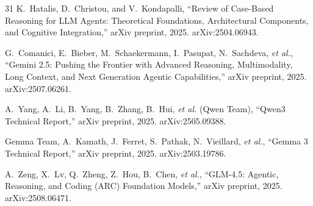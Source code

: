 \documentclass[lettersize,journal]{IEEEtran}
\begin{document}
\begin{thebibliography}{31}
K.~Hatalis, D.~Christou, and V.~Kondapalli, ``Review of Case-Based Reasoning for LLM Agents: Theoretical Foundations, Architectural Components, and Cognitive Integration,'' arXiv preprint, 2025. arXiv:2504.06943.

G.~Comanici, E.~Bieber, M.~Schaekermann, I.~Pasupat, N.~Sachdeva, \textit{et al.}, ``Gemini 2.5: Pushing the Frontier with Advanced Reasoning, Multimodality, Long Context, and Next Generation Agentic Capabilities,'' arXiv preprint, 2025. arXiv:2507.06261.

A.~Yang, A.~Li, B.~Yang, B.~Zhang, B.~Hui, \textit{et al.} (Qwen Team), ``Qwen3 Technical Report,'' arXiv preprint, 2025. arXiv:2505.09388.

Gemma Team, A.~Kamath, J.~Ferret, S.~Pathak, N.~Vieillard, \textit{et al.}, ``Gemma 3 Technical Report,'' arXiv preprint, 2025. arXiv:2503.19786.

A.~Zeng, X.~Lv, Q.~Zheng, Z.~Hou, B.~Chen, \textit{et al.}, ``GLM-4.5: Agentic, Reasoning, and Coding (ARC) Foundation Models,'' arXiv preprint, 2025. arXiv:2508.06471.

\end{thebibliography}
\end{document}
